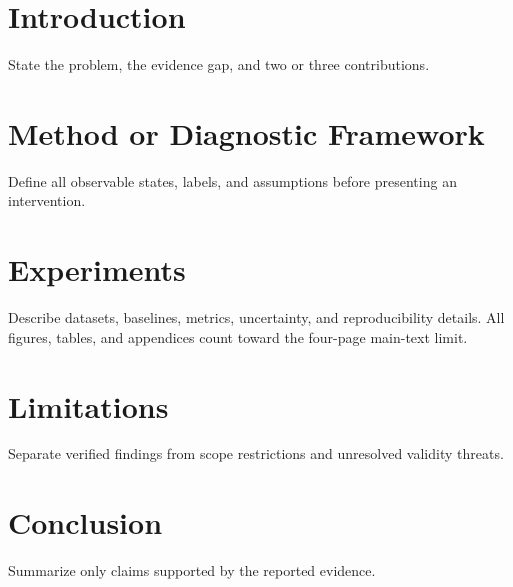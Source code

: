 \section{Introduction}

State the problem, the evidence gap, and two or three contributions.

\section{Method or Diagnostic Framework}

Define all observable states, labels, and assumptions before presenting an intervention.

\section{Experiments}

Describe datasets, baselines, metrics, uncertainty, and reproducibility details. All figures, tables, and appendices count toward the four-page main-text limit.

\section{Limitations}

Separate verified findings from scope restrictions and unresolved validity threats.

\section{Conclusion}

Summarize only claims supported by the reported evidence.

